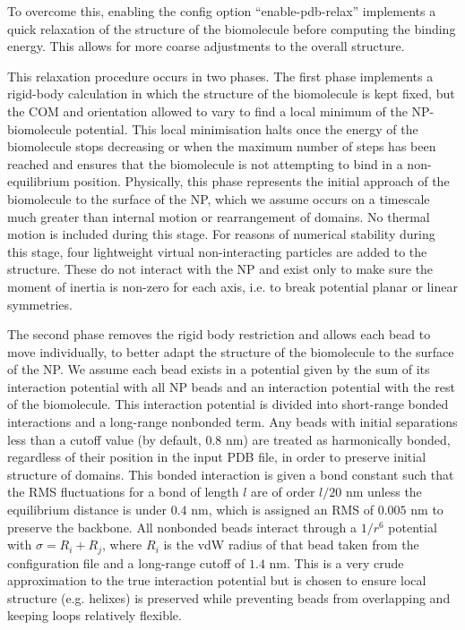 \documentclass[10pt,a4paper,onecolumn]{report}
\begin{document}
To overcome this, enabling the config option ``enable-pdb-relax'' implements a quick relaxation of the structure of the biomolecule before computing the binding energy. This allows for more coarse adjustments to the overall structure.

This relaxation procedure occurs in two phases. The first phase implements a rigid-body calculation in which the structure of the biomolecule is kept fixed, but the COM and orientation allowed to vary to find a local minimum of the NP-biomolecule potential. This local minimisation halts once the energy of the biomolecule stops decreasing or when the maximum number of steps has been reached and ensures that the biomolecule is not attempting to bind in a non-equilibrium position. Physically, this phase represents the initial approach of the biomolecule to the surface of the NP, which we assume occurs on a timescale much greater than internal motion or rearrangement of domains. No thermal motion is included during this stage. For reasons of numerical stability during this stage, four lightweight virtual non-interacting particles are added to the structure. These do not interact with the NP and exist only to make sure the moment of inertia is non-zero for each axis, i.e. to break potential planar or linear symmetries. 


The second phase removes the rigid body restriction and allows each bead to move individually, to better adapt the structure of the biomolecule to the surface of the NP. We assume each bead exists in a potential given by the sum of its interaction potential with all NP beads and an interaction potential with the rest of the biomolecule. This interaction potential is divided into short-range bonded interactions and a long-range nonbonded term. 
Any beads with initial separations less than a cutoff value (by default, $0.8$ nm)  are treated as harmonically bonded, regardless of their position in the input PDB file, in order to preserve initial structure of domains. This bonded interaction is given a bond constant such that the RMS fluctuations for a bond of length $l$ are of order $l/20$ nm unless the equilibrium distance is under $0.4$ nm, which is assigned an RMS of $0.005$ nm to preserve the backbone.  All nonbonded beads interact through a $1/r^6$  potential with $\sigma = R_i + R_j$, where $R_i$ is the vdW radius of that bead taken from the configuration file and a long-range cutoff of $1.4$ nm. 
This is a very crude approximation to the true interaction potential but is chosen to ensure local structure (e.g. helixes)  is preserved while preventing beads from overlapping and keeping loops relatively flexible. 
\end{document}
